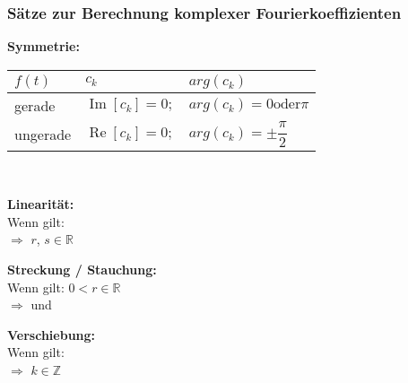 			\subsubsection{Sätze zur Berechnung komplexer Fourierkoeffizienten}
				\begin{minipage}[t]{0.5\textwidth}
					\textbf{Symmetrie:}\\[3pt]
					\begin{tabular}{|l|l|l|}
						\hline
						$f(t)$ & $c_k$ & $arg(c_k)$\\[3pt]
						\hline
						gerade & $\displaystyle \operatorname{Im}[c_k] = 0 ;$ & $\displaystyle arg(c_k) = 0 \text{oder} \pi$\\[3pt]
						\hline
						ungerade & $\displaystyle \operatorname{Re}[c_k] = 0 ;$ & $\displaystyle arg(c_k) = \pm \dfrac{\pi}{2}$\\[3pt]
						\hline
					\end{tabular}\\[6pt]
				\end{minipage}
				\begin{minipage}[t]{0.5\textwidth}
					\textbf{Linearität:}\\[3pt]
					Wenn gilt: \\[3pt]
					$\Rightarrow$  $r$, $s \in \mathbb{R}$\\[6pt]
				\end{minipage}
				\begin{minipage}[t]{0.5\textwidth}
					\textbf{Streckung / Stauchung:}\\[3pt]
					Wenn gilt:  $0 < r \in \mathbb{R}$\\[3pt]
					$\Rightarrow$  und 
				\end{minipage}
				\begin{minipage}[t]{0.5\textwidth}
					\textbf{Verschiebung:}\\[3pt]
					Wenn gilt: \\[3pt]
					$\Rightarrow$  $k \in \mathbb{Z}$
				\end{minipage}
			
